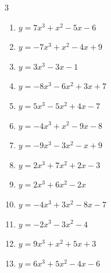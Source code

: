 \begin{multicols}{3}
\begin{enumerate}
  \item $y=7x^{3}+x^{2}-5x-6$


\columnbreak %

  \item $y=-7x^{3}+x^{2}-4x+9$


  \item $y=3x^{3}-3x-1$


  \item $y=-8x^{3}-6x^{2}+3x+7$


  \item $y=5x^{3}-5x^{2}+4x-7$


  \item $y=-4x^{3}+x^{2}-9x-8$


  \item $y=-9x^{3}-3x^{2}-x+9$


  \item $y=2x^{3}+7x^{2}+2x-3$


  \item $y=2x^{3}+6x^{2}-2x$


  \item $y=-4x^{3}+3x^{2}-8x-7$


  \item $y=-2x^{3}-3x^{2}-4$


  \item $y=9x^{3}+x^{2}+5x+3$


  \item $y=6x^{3}+5x^{2}-4x-6$


\end{enumerate}
\end{multicols}
